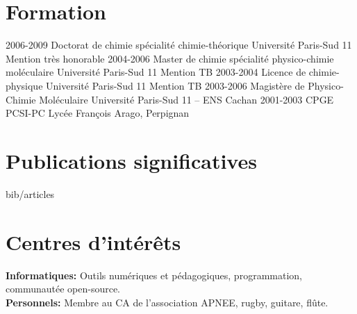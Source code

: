 \documentclass[french]{cv-style}      %
\begin{document}

\section{Formation}

\begin{entrylist}
\entry
{2006-2009}
{Doctorat de chimie {\normalfont spécialité chimie-théorique}}
{Université Paris-Sud 11}
{Mention très honorable}
\entry
{2004-2006}
{Master de chimie {\normalfont spécialité physico-chimie moléculaire}}
{Université Paris-Sud 11}
{Mention TB}
\entry
{2003-2004}
{Licence de chimie-physique}
{Université Paris-Sud 11}
{Mention TB}
\entry
{2003-2006}
{Magistère de Physico-Chimie Moléculaire}
{Université Paris-Sud 11 -- ENS Cachan}
{}
\entry
{2001-2003}
{CPGE {\normalfont PCSI-PC}}
{Lycée François Arago, Perpignan}
{}
\end{entrylist}


\section{Publications significatives}

\nocite{vallverdu2016, guille2015, Guille2014, Martin2012, Maillet2011, Vallverdu2010}
\begin{btSect}{bib/articles}
    \btPrintCited
\end{btSect}


\section{Centres d'intérêts}
  \vspace{-0.2cm}

\textbf{Informatiques:} Outils numériques et pédagogiques, programmation,
communautée open-source.\\
\textbf{Personnels:} Membre au CA de l'association APNEE, rugby, guitare, flûte.

\end{document}

